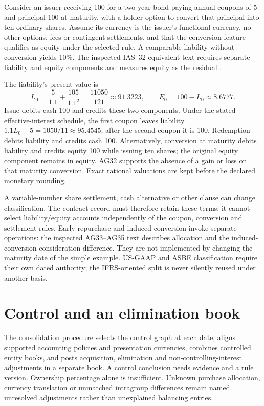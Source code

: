 Consider an issuer receiving 100 for a two-year bond paying annual coupons of
5 and principal 100 at maturity, with a holder option to convert that principal
into ten ordinary shares. Assume its currency is the issuer's functional
currency, no other options, fees or contingent settlements, and that the
conversion feature qualifies as equity under the selected rule. A comparable
liability without conversion yields 10\%. The inspected IAS~32-equivalent
text requires separate liability and equity components and measures equity
as the residual \citep[paragraphs 28--32, AG30--AG32]{aasb132}.

The liability's present value is
\[
 L_0=\frac{5}{1.1}+\frac{105}{1.1^2}
     =\frac{11050}{121}\approx91.3223,
 \qquad E_0=100-L_0\approx8.6777.
\]
Issue debits cash 100 and credits these two components. Under the stated
effective-interest schedule, the first coupon leaves liability
$1.1L_0-5=1050/11\approx95.4545$; after the second coupon it is 100.
Redemption debits liability and credits cash 100. Alternatively, conversion
at maturity debits liability and credits equity 100 while issuing ten shares;
the original equity component remains in equity. AG32 supports the absence
of a gain or loss on that maturity conversion. Exact rational valuations are
kept before the declared monetary rounding.

A variable-number share settlement, cash alternative or other clause can
change classification. The contract record must therefore retain these terms;
it cannot select liability/equity accounts independently of the coupon,
conversion and settlement rules. Early repurchase and induced conversion
invoke separate operations: the inspected AG33--AG35 text describes allocation
and the induced-conversion consideration difference. They are not implemented
by changing the maturity date of the simple example. US-GAAP and ASBE
classification require their own dated authority; the IFRS-oriented split is
never silently reused under another basis.



\section{Control and an elimination book}

The consolidation procedure selects the control graph at each date, aligns
supported accounting policies and presentation currencies, combines controlled
entity books, and posts acquisition, elimination and non-controlling-interest
adjustments in a separate book. A control conclusion needs evidence and a
rule version. Ownership percentage alone is insufficient. Unknown purchase
allocation, currency translation or unmatched intragroup differences remain
named unresolved adjustments rather than unexplained balancing entries.

